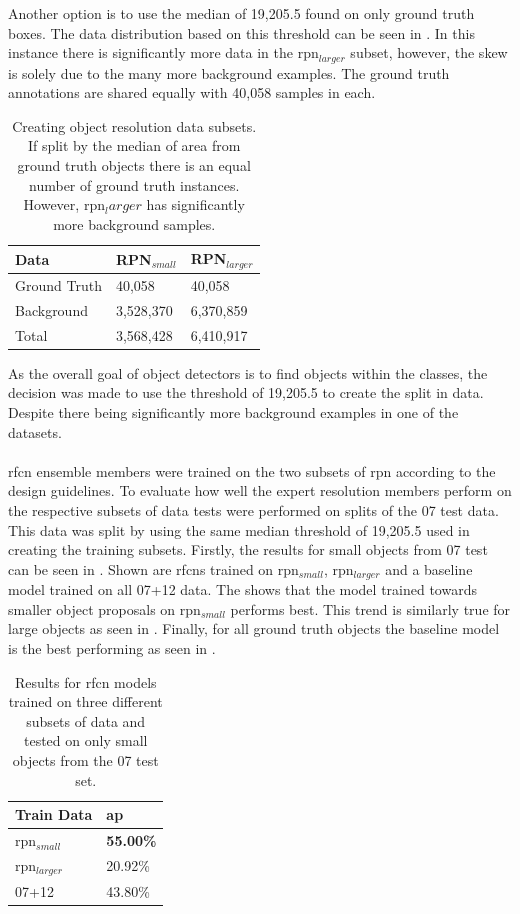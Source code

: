 Another option is to use the median of 19,205.5 found on only ground truth boxes. The data distribution based on this threshold can be seen in . In this instance there is significantly more data in the \gls{rpn}$_{larger}$ subset, however, the skew is solely due to the many more background examples. The ground truth annotations are shared equally with 40,058 samples in each.

\begin{table}[h]
\centering
\caption{Creating object resolution data subsets. If split by the median of area from ground truth objects there is an equal number of ground truth instances. However, \gls{rpn}$_larger$ has significantly more background samples.}
\label{tab:splitgt}
\begin{tabular}{|l|l|l|}
\hline
\textbf{Data} & \textbf{RPN$_{small}$} & \textbf{RPN$_{larger}$} \\ \hline
Ground Truth & 40,058    & 40,058     \\ 
Background   & 3,528,370 & 6,370,859  \\ \hline
Total        & 3,568,428 & 6,410,917  \\ \hline
\end{tabular}
\end{table}

As the overall goal of object detectors is to find objects within the classes, the decision was made to use the threshold of 19,205.5 to create the split in data. Despite there being significantly more background examples in one of the datasets. 
\\\\
\gls{rfcn} ensemble members were trained on the two subsets of \gls{rpn} according to the design guidelines. To evaluate how well the expert resolution members perform on the respective subsets of data tests were performed on splits of the 07 test data. This data was split by using the same median threshold of 19,205.5 used in creating the training subsets. Firstly, the results for small objects from 07 test can be seen in . Shown are \glspl{rfcn} trained on \gls{rpn}$_{small}$, \gls{rpn}$_{larger}$ and a baseline model trained on all 07+12 data. The shows that the model trained towards smaller object proposals on \gls{rpn}$_{small}$ performs best. This trend is similarly true for large objects as seen in . Finally, for all ground truth objects the baseline model is the best performing as seen in .


\begin{table}[h]
\centering
\caption{Results for \gls{rfcn} models trained on three different subsets of data and tested on only small objects from the 07 test set.}
\label{tab:small07res}
\begin{tabular}{|l|l|}
\hline
\textbf{Train Data} & \textbf{\gls{ap}}      \\ \hline
\gls{rpn}$_{small}$      & \textbf{55.00\%} \\ \hline
\gls{rpn}$_{larger}$      & 20.92\% \\ \hline
07+12        & 43.80\% \\ \hline
\end{tabular}
\end{table}

